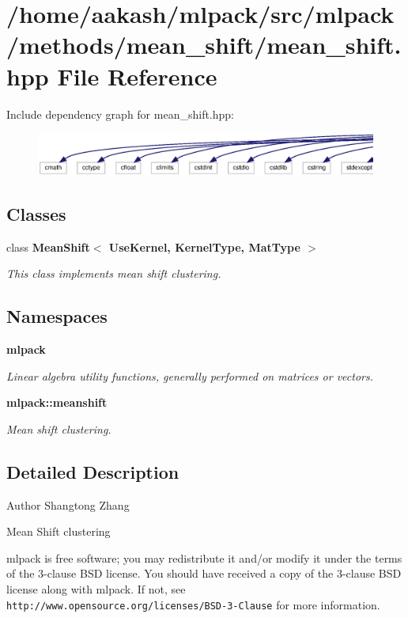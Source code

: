 \section{/home/aakash/mlpack/src/mlpack/methods/mean\+\_\+shift/mean\+\_\+shift.hpp File Reference}
\label{mean__shift_8hpp}
Include dependency graph for mean\+\_\+shift.\+hpp\+:
\nopagebreak
\begin{figure}[H]
\begin{center}
\leavevmode
\includegraphics[width=350pt]{mean__shift_8hpp__incl}
\end{center}
\end{figure}
\subsection*{Classes}
\begin{DoxyCompactItemize}
\item 
class \textbf{ Mean\+Shift$<$ Use\+Kernel, Kernel\+Type, Mat\+Type $>$}
\begin{DoxyCompactList}\small\item\em This class implements mean shift clustering. \end{DoxyCompactList}\end{DoxyCompactItemize}
\subsection*{Namespaces}
\begin{DoxyCompactItemize}
\item 
 \textbf{ mlpack}
\begin{DoxyCompactList}\small\item\em Linear algebra utility functions, generally performed on matrices or vectors. \end{DoxyCompactList}\item 
 \textbf{ mlpack\+::meanshift}
\begin{DoxyCompactList}\small\item\em Mean shift clustering. \end{DoxyCompactList}\end{DoxyCompactItemize}


\subsection{Detailed Description}
\begin{DoxyAuthor}{Author}
Shangtong Zhang
\end{DoxyAuthor}
Mean Shift clustering

mlpack is free software; you may redistribute it and/or modify it under the terms of the 3-\/clause B\+SD license. You should have received a copy of the 3-\/clause B\+SD license along with mlpack. If not, see {\tt http\+://www.\+opensource.\+org/licenses/\+B\+S\+D-\/3-\/\+Clause} for more information. 
